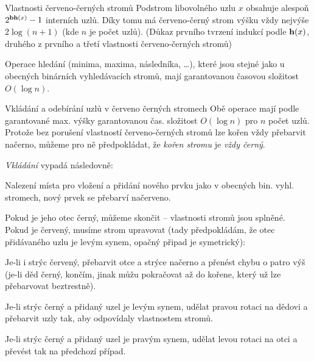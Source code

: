 \begin{vetaN}{Vlastnosti červeno-černých stromů}
Podstrom libovolného uzlu $x$ obsahuje alespoň $2^{\mathbf{bh}(x)}-1$ interních uzlů. Díky tomu má červeno-černý strom výšku vždy nejvýše $2\log(n+1)$ (kde $n$ je počet uzlů). (Důkaz prvního tvrzení indukcí podle $\mathbf{h}(x)$, druhého z prvního a třetí vlastnosti červeno-černých stromů)
    \end{vetaN}

\begin{dusledek}
Operace hledání (minima, maxima, následníka, \dots), které jsou stejné jako u obecných binárních vyhledávacích stromů, mají garantovanou časovou složitost $O(\log n)$.
\end{dusledek}

\begin{algoritmusN}{Vkládání a odebírání uzlů v červeno černých stromech}
Obě operace mají podle garantované max. výšky garantovanou čas. složitost $O(\log n)$ pro $n$ počet uzlů. Protože bez porušení vlastností červeno-černých stromů lze kořen vždy přebarvit načerno, můžeme pro ně předpokládat, že \emph{kořen stromu} je \emph{vždy černý}.

\emph{Vkládání} vypadá následovně:
\begin{pitemize}
    \item Nalezení místa pro vložení a přidání nového prvku jako v obecných bin. vyhl. stromech, nový prvek se přebarví načerveno.
    \item Pokud je jeho otec černý, můžeme skončit -- vlastnosti stromů jsou splněné. Pokud je červený, musíme strom upravovat (tady předpokládám, že otec přidávaného uzlu je levým synem, opačný připad je symetrický):
    \item Je-li i strýc červený, přebarvit otce a strýce načerno a přenést chybu o patro výš (je-li děd černý, končím, jinak můžu pokračovat až do kořene, který už lze přebarvovat beztrestně).
    \item Je-li strýc černý a přidaný uzel je levým synem, udělat pravou rotaci na dědovi a přebarvit uzly tak, aby odpovídaly vlastnostem stromů.
    \item Je-li strýc černý a přidaný uzel je pravým synem, udělat levou rotaci na otci a převést tak na předchozí případ.
\end{pitemize}


\end{algoritmusN}
